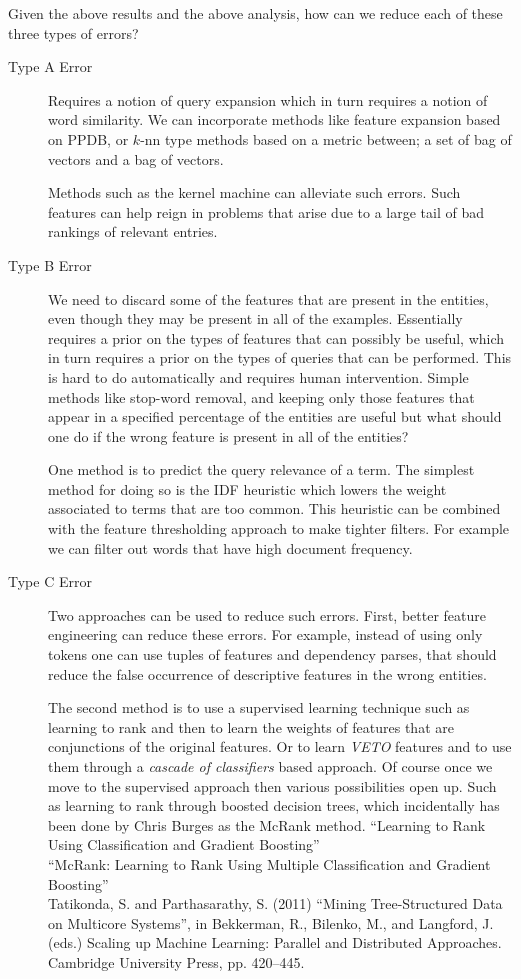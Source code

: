 \documentclass{article}
\begin{document}
Given the above results and the above analysis, how can we reduce each of these
three types of errors?
\begin{description}
\item[Type A Error] Requires a notion of query expansion which in turn
  requires a notion of word similarity. We can
  incorporate methods like feature expansion based on PPDB, or $k$-nn type
  methods based on a metric between; a set of bag of vectors and a bag of
  vectors.

  Methods such as the kernel machine can alleviate such errors.
  Such features can help reign in problems that arise due to a large tail of bad
  rankings of relevant entries.
\item[Type B Error] We need to discard some of the features that are present in
  the entities, even though they may be present in all of the examples.
  Essentially requires a prior on the types
  of features that can possibly be useful, which in turn requires a prior on the
  types of queries that can be performed. This is hard to do automatically and
  requires human intervention. Simple methods like stop-word removal, and
  keeping only those features that appear in a specified percentage of the
  entities are useful but what should one do if the wrong feature is present in
  all of the entities?

  One method is to predict the query relevance of a term. The simplest method for
  doing so is the IDF heuristic which lowers the weight associated to terms that
  are too common. This heuristic can be combined with the feature thresholding approach
  to make tighter filters. For example we can filter out words that have high document
  frequency.
\item[Type C Error] Two approaches can be used to reduce such errors.
  First, better feature engineering can
  reduce these errors. For example, instead of using only tokens one can use
  tuples of features and dependency parses, that should reduce the false
  occurrence of descriptive features in the wrong entities.

  The second method is to use a supervised learning technique such as learning to
  rank and then to learn the weights of features that are conjunctions of the
  original features. Or to learn \textit{VETO} features and to use them through
  a \textit{cascade of classifiers} based approach. Of course once we move to
  the supervised approach then various possibilities open up. Such as learning
  to rank through boosted decision trees, which incidentally has been done by
  Chris Burges as the McRank method.
  ``Learning to Rank Using Classification and Gradient Boosting''\\
  ``McRank: Learning to Rank Using Multiple Classification and Gradient
  Boosting''\\
  Tatikonda, S. and Parthasarathy, S. (2011) ``Mining Tree-Structured Data on
  Multicore Systems'', in Bekkerman, R., Bilenko, M., and Langford, J. (eds.)
  Scaling up Machine Learning: Parallel and Distributed Approaches. Cambridge
  University Press, pp. 420–445.
\end{description}
\end{document}
